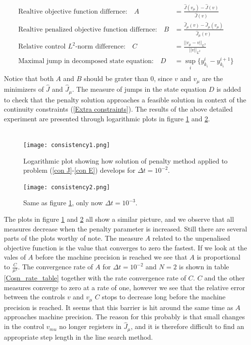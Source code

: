 \begin{align*}
\textrm{Realtive objective function differnce:}\quad A &= \frac{\hat{J}(v_{\mu})-\hat{J}(v)}{\hat{J}(v)}\\
\textrm{Realtive penalized objective function differnce:}\quad B &= \frac{\hat{J}_{\mu}(v)-\hat{J}_{\mu}(v_{\mu})}{\hat{J}_{\mu}(v)}\\
\textrm{Relative control $L^2$-norm difference:}\quad C&=\frac{||v_{\mu}-v||_ {L^2}}{||v||_{L^2}} \\
\textrm{Maximal jump in decomposed state equation:}\quad D&= \sup_i\{y_{k_i}^i-y_{k_i}^{i+1}\}\\
\end{align*}
Notice that both $A$ and $B$ should be grater than $0$, since $v$ and $v_{\mu}$ are the minimizers of $\hat J$ and $\hat J_ {\mu}$. The measure of jumps in the state equation $D$ is added to check that the penalty solution approaches a feasible solution in context of the continuity constraints (\ref{Extra constraints}). The results of the above detailed experiment are presented through logarithmic plots in figure \ref{Cons1_fig} and \ref{Cons2_fig}. 
\\
\\
\begin{figure}[!h]
\centering
\texttt{[image: consistency1.png]}
\caption{Logarithmic plot showing how solution of penalty method applied to problem (\ref{con J}-\ref{con E}) develops for $\Delta t = 10^{-2}$.}
\label{Cons1_fig}
\end{figure}
\begin{figure}[!h]
\centering
\texttt{[image: consistency2.png]}
\caption{Same as figure \ref{Cons1_fig}, only now $\Delta t = 10^{-3}$.}
\label{Cons2_fig}
\end{figure}
The plots in figure \ref{Cons1_fig} and \ref{Cons2_fig} all show a similar picture, and we observe that all measures decrease when the penalty parameter is increased. Still there are several parts of the plots worthy of note. The measure $A$ related to the unpenalised objective function is the value that converges to zero the fastest. If we look at the vales of $A$ before the machine precision is reached we see that $A$ is proportional to $\frac{C}{\mu^2}$. The convergence rate of $A$ for $\Delta t=10^{-2}$ and $N=2$ is shown in table \ref{Cosn_rate_table} together with the rate convergence rate of $C$. $C$ and the other measures converge to zero at a rate of one, however we see that the relative error between the controls $v$ and $v_{\mu}$ $C$ stops to decrease long before the machine precision is reached. It seems that this barrier is hit around the same time as $A$ approaches machine precision. The reason for this probably is that small changes in the control $v_{mu}$ no longer registers in $\hat J_{\mu}$, and it is therefore difficult to find an appropriate step length in the line search method.
